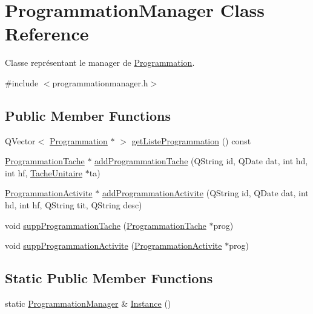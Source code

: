 \hypertarget{class_programmation_manager}{}\section{Programmation\+Manager Class Reference}
\label{class_programmation_manager}


Classe représentant le manager de \hyperlink{class_programmation}{Programmation}.  




{\ttfamily \#include $<$programmationmanager.\+h$>$}

\subsection*{Public Member Functions}
\begin{DoxyCompactItemize}
\item 
Q\+Vector$<$ \hyperlink{class_programmation}{Programmation} $\ast$ $>$ \hyperlink{class_programmation_manager_a05398cf87cb227b0e2e9fbf93b36af80}{get\+Liste\+Programmation} () const 
\item 
\hyperlink{class_programmation_tache}{Programmation\+Tache} $\ast$ \hyperlink{class_programmation_manager_a286ba93621f944ed4e3d52a6c32b9f46}{add\+Programmation\+Tache} (Q\+String id, Q\+Date dat, int hd, int hf, \hyperlink{class_tache_unitaire}{Tache\+Unitaire} $\ast$ta)
\item 
\hyperlink{class_programmation_activite}{Programmation\+Activite} $\ast$ \hyperlink{class_programmation_manager_afcead9271094c4b839a750527406c366}{add\+Programmation\+Activite} (Q\+String id, Q\+Date dat, int hd, int hf, Q\+String tit, Q\+String desc)
\item 
void \hyperlink{class_programmation_manager_af3c39775fa3ea5a8642181dbed0a519c}{supp\+Programmation\+Tache} (\hyperlink{class_programmation_tache}{Programmation\+Tache} $\ast$prog)
\item 
void \hyperlink{class_programmation_manager_a2781cb1d7ae670b5b779cbe76f7714a6}{supp\+Programmation\+Activite} (\hyperlink{class_programmation_activite}{Programmation\+Activite} $\ast$prog)
\end{DoxyCompactItemize}
\subsection*{Static Public Member Functions}
\begin{DoxyCompactItemize}
\item 
static \hyperlink{class_programmation_manager}{Programmation\+Manager} \& \hyperlink{class_programmation_manager_a8b2d81872d9d34cc33e0a0b348875550}{Instance} ()
\end{DoxyCompactItemize}
